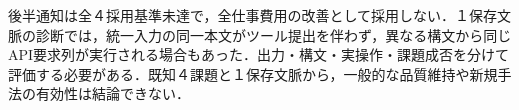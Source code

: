 後半通知は全４採用基準未達で，全仕事費用の改善として採用しない．１保存文脈の診断では，統一入力の同一本文がツール提出を伴わず，異なる構文から同じAPI要求列が実行される場合もあった．出力・構文・実操作・課題成否を分けて評価する必要がある．既知４課題と１保存文脈から，一般的な品質維持や新規手法の有効性は結論できない．

